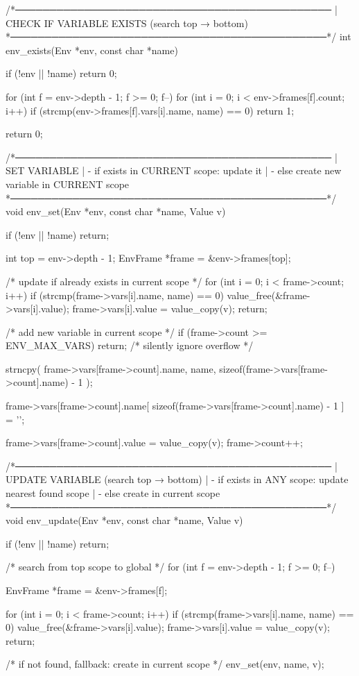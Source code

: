 \documentclass{article}
\begin{document}
/*──────────────────────────────────────────────
 | CHECK IF VARIABLE EXISTS (search top → bottom)
 *──────────────────────────────────────────────*/
int env_exists(Env *env, const char *name)
{
    if (!env || !name) return 0;

    for (int f = env->depth - 1; f >= 0; f--) {
        for (int i = 0; i < env->frames[f].count; i++) {
            if (strcmp(env->frames[f].vars[i].name, name) == 0) {
                return 1;
            }
        }
    }

    return 0;
}

/*──────────────────────────────────────────────
 | SET VARIABLE
 | - if exists in CURRENT scope: update it
 | - else create new variable in CURRENT scope
 *──────────────────────────────────────────────*/
void env_set(Env *env, const char *name, Value v)
{
    if (!env || !name) return;

    int top = env->depth - 1;
    EnvFrame *frame = &env->frames[top];

    /* update if already exists in current scope */
    for (int i = 0; i < frame->count; i++) {
        if (strcmp(frame->vars[i].name, name) == 0) {
            value_free(&frame->vars[i].value);
            frame->vars[i].value = value_copy(v);
            return;
        }
    }

    /* add new variable in current scope */
    if (frame->count >= ENV_MAX_VARS) {
        return; /* silently ignore overflow */
    }

    strncpy(
        frame->vars[frame->count].name,
        name,
        sizeof(frame->vars[frame->count].name) - 1
    );

    frame->vars[frame->count].name[
        sizeof(frame->vars[frame->count].name) - 1
    ] = '\0';

    frame->vars[frame->count].value = value_copy(v);
    frame->count++;
}

/*──────────────────────────────────────────────
 | UPDATE VARIABLE (search top → bottom)
 | - if exists in ANY scope: update nearest found scope
 | - else create in current scope
 *──────────────────────────────────────────────*/
void env_update(Env *env, const char *name, Value v)
{
    if (!env || !name) return;

    /* search from top scope to global */
    for (int f = env->depth - 1; f >= 0; f--) {
        EnvFrame *frame = &env->frames[f];

        for (int i = 0; i < frame->count; i++) {
            if (strcmp(frame->vars[i].name, name) == 0) {
                value_free(&frame->vars[i].value);
                frame->vars[i].value = value_copy(v);
                return;
            }
        }
    }

    /* if not found, fallback: create in current scope */
    env_set(env, name, v);
}
\end{document}
